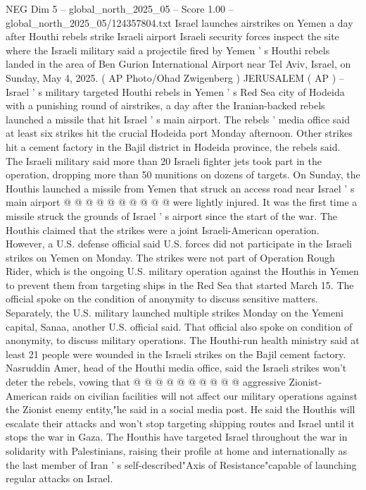 \begin{textsample}{NEG Dim 5 – global\_north\_2025\_05 – Score 1.00 – global\_north\_2025\_05/124357804.txt}  \label{ex:f5_neg_377}
Israel launches airstrikes on Yemen a day after Houthi rebels strike Israeli airport Israeli security forces inspect the site where the Israeli military said a projectile fired by Yemen ' s Houthi rebels landed in the area of Ben Gurion International Airport near Tel Aviv, Israel, on Sunday, May 4, 2025. ( AP Photo/Ohad Zwigenberg ) JERUSALEM ( AP ) -- Israel ' s military targeted Houthi rebels in Yemen ' s Red Sea city of Hodeida with a punishing round of airstrikes, a day after the Iranian-backed rebels launched a missile that hit Israel ' s main airport.
The rebels ' media office said at least six strikes hit the crucial Hodeida port Monday afternoon.
Other strikes hit a cement factory in the Bajil district in Hodeida province, the rebels said.
The Israeli military said more than 20 Israeli fighter jets took part in the operation, dropping more than 50 munitions on dozens of targets.
On Sunday, the Houthis launched a missile from Yemen that struck an access road near Israel ' s main airport @ @ @ @ @ @ @ @ @ @ were lightly injured.
It was the first time a missile struck the grounds of Israel ' s airport since the start of the war.
The Houthis claimed that the strikes were a joint Israeli-American operation.
However, a U.S. defense official said U.S. forces did not participate in the Israeli strikes on Yemen on Monday.
The strikes were not part of Operation Rough Rider, which is the ongoing U.S. military operation against the Houthis in Yemen to prevent them from targeting ships in the Red Sea that started March 15.
The official spoke on the condition of anonymity to discuss sensitive matters.
Separately, the U.S. military launched multiple strikes Monday on the Yemeni capital, Sanaa, another U.S. official said.
That official also spoke on condition of anonymity, to discuss military operations.
The Houthi-run health ministry said at least 21 people were wounded in the Israeli strikes on the Bajil cement factory.
Nasruddin Amer, head of the Houthi media office, said the Israeli strikes won't deter the rebels, vowing that @ @ @ @ @ @ @ @ @ @ aggressive Zionist-American raids on civilian facilities will not affect our military operations against the Zionist enemy entity,"he said in a social media post.
He said the Houthis will escalate their attacks and won't stop targeting shipping routes and Israel until it stops the war in Gaza.
The Houthis have targeted Israel throughout the war in solidarity with Palestinians, raising their profile at home and internationally as the last member of Iran ' s self-described"Axis of Resistance"capable of launching regular attacks on Israel.

\end{textsample}

